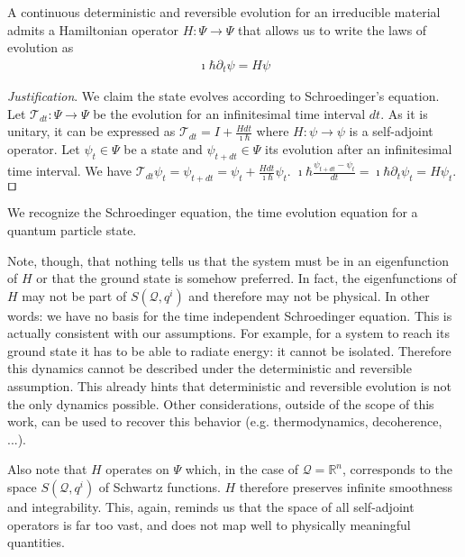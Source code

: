 \documentclass[smallextended]{svjour3}
\numberwithin{equation}{section}
\newenvironment{justification}{\emph{Justification}.}{\hfill\(\qed\)}
\begin{document}
	
\begin{prop}\label{prop:schroedinger_equation}
	A continuous deterministic and reversible evolution for an irreducible material admits a Hamiltonian operator $H : \Psi \rightarrow \Psi$ that allows us to write the laws of evolution as
	\begin{align*}
	\imath \hbar \partial_t \psi = H \psi
	\end{align*}
\end{prop}

\begin{justification}
	We claim the state evolves according to Schroedinger's equation. Let  $\mathcal{T}_{dt}: \Psi \rightarrow \Psi$ be the evolution for an infinitesimal time interval $dt$. As it is unitary, it can be expressed as $\mathcal{T}_{dt} = I + \frac{H dt}{\imath \hbar}$ where $H : \psi \rightarrow \psi$ is a self-adjoint operator. Let $\psi_t \in \Psi$ be a state and $\psi_{t+dt} \in \Psi$ its evolution after an infinitesimal time interval. We have $\mathcal{T}_{dt} \psi_t = \psi_{t+dt} = \psi_t + \frac{H dt}{\imath \hbar} \psi_t$. $\imath \hbar \frac{\psi_{t+dt} - \psi_t}{dt} = \imath \hbar \partial_t \psi_t = H\psi_t$.
\end{justification}

We recognize the Schroedinger equation, the time evolution equation for a quantum particle state.

Note, though, that nothing tells us that the system must be in an eigenfunction of $H$ or that the ground state is somehow preferred. In fact, the eigenfunctions of $H$ may not be part of $S(\mathcal{Q}, q^i)$ and therefore may not be physical. In other words: we have no basis for the time independent Schroedinger equation. This is actually consistent with our assumptions. For example, for a system to reach its ground state it has to be able to radiate energy: it cannot be isolated. Therefore this dynamics cannot be described under the deterministic and reversible assumption. This already hints that deterministic and reversible evolution is not the only dynamics possible. Other considerations, outside of the scope of this work, can be used to recover this behavior (e.g. thermodynamics, decoherence, ...).

Also note that $H$ operates on $\Psi$ which, in the case of $\mathcal{Q}=\mathbb{R}^n$, corresponds to the space $S(\mathcal{Q}, q^i)$ of Schwartz functions. $H$ therefore preserves infinite smoothness and integrability. This, again, reminds us that the space of all self-adjoint operators is far too vast, and does not map well to physically meaningful quantities.
\end{document}
